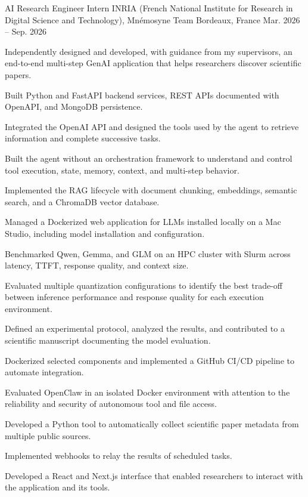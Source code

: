 
\begin{cventries}
  \cventry
    {AI Research Engineer Intern}
    {INRIA (French National Institute for Research in Digital Science and Technology), Mnémosyne Team}
    {Bordeaux, France}
    {Mar. 2026 -- Sep. 2026}
    {
      \begin{cvitems}
        \item {Independently designed and developed, with guidance from my supervisors, an end-to-end multi-step GenAI application that helps researchers discover scientific papers.}
        \item {Built Python and FastAPI backend services, REST APIs documented with OpenAPI, and MongoDB persistence.}
        \item {Integrated the OpenAI API and designed the tools used by the agent to retrieve information and complete successive tasks.}
        \item {Built the agent without an orchestration framework to understand and control tool execution, state, memory, context, and multi-step behavior.}
        \item {Implemented the RAG lifecycle with document chunking, embeddings, semantic search, and a ChromaDB vector database.}
        \item {Managed a Dockerized web application for LLMs installed locally on a Mac Studio, including model installation and configuration.}
        \item {Benchmarked Qwen, Gemma, and GLM on an HPC cluster with Slurm across latency, TTFT, response quality, and context size.}
        \item {Evaluated multiple quantization configurations to identify the best trade-off between inference performance and response quality for each execution environment.}
        \item {Defined an experimental protocol, analyzed the results, and contributed to a scientific manuscript documenting the model evaluation.}
        \item {Dockerized selected components and implemented a GitHub CI/CD pipeline to automate integration.}
        \item {Evaluated OpenClaw in an isolated Docker environment with attention to the reliability and security of autonomous tool and file access.}
        \item {Developed a Python tool to automatically collect scientific paper metadata from multiple public sources.}
        \item {Implemented webhooks to relay the results of scheduled tasks.}
        \item {Developed a React and Next.js interface that enabled researchers to interact with the application and its tools.}
      \end{cvitems}
    }


\end{cventries}
